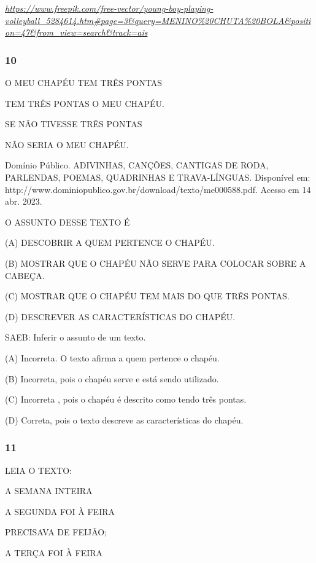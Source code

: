 \href{https://www.freepik.com/free-vector/young-boy-playing-volleyball_5284614.htm\#page=3\&query=MENINO\%20CHUTA\%20BOLA\&position=47\&from_view=search\&track=ais}{\emph{https://www.freepik.com/free-vector/young-boy-playing-volleyball\_5284614.htm\#page=3\&query=MENINO\%20CHUTA\%20BOLA\&position=47\&from\_view=search\&track=ais}}

\subsubsection{10}\label{section-35}

O MEU CHAPÉU TEM TRÊS PONTAS

TEM TRÊS PONTAS O MEU CHAPÉU.

SE NÃO TIVESSE TRÊS PONTAS 

NÃO SERIA O MEU CHAPÉU. 

Domínio Público. ADIVINHAS, CANÇÕES, CANTIGAS DE RODA, PARLENDAS, POEMAS, QUADRINHAS E TRAVA-LÍNGUAS. Disponível em: http://www.dominiopublico.gov.br/download/texto/me000588.pdf. Acesso em 14 abr. 2023.

O ASSUNTO DESSE TEXTO É

(A) DESCOBRIR A QUEM PERTENCE O CHAPÉU.

(B) MOSTRAR QUE O CHAPÉU NÃO SERVE PARA COLOCAR SOBRE A CABEÇA.

(C) MOSTRAR QUE O CHAPÉU TEM MAIS DO QUE TRÊS PONTAS.

(D) DESCREVER AS CARACTERÍSTICAS DO CHAPÉU.


SAEB: Inferir o assunto de um texto.

\protect\hypertarget{_heading=h.4f1mdlm}{}{}
(A) Incorreta. O texto afirma a quem pertence o chapéu.

(B) Incorreta, pois o chapéu serve e está sendo utilizado. 

(C) Incorreta , pois o chapéu é descrito como tendo três pontas.

(D) Correta, pois o texto descreve as características do chapéu.

\subsubsection{11}\label{section-36}

LEIA O TEXTO:

A SEMANA INTEIRA

A SEGUNDA FOI À FEIRA

PRECISAVA DE FEIJÃO;

A TERÇA FOI À FEIRA

